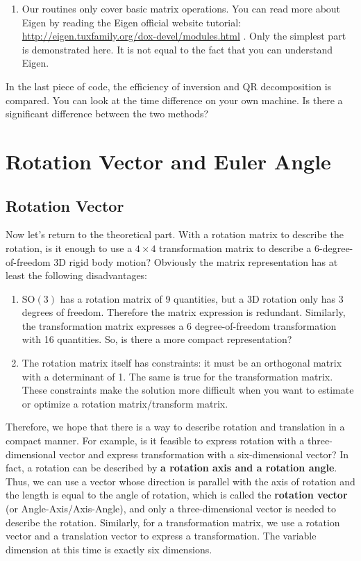 \begin{enumerate}
    \item Our routines only cover basic matrix operations. You can read more about Eigen by reading the Eigen official website tutorial: \\ { \url{http://eigen.tuxfamily.org/dox-devel/modules.html} }. Only the simplest part is demonstrated here. It is not equal to the fact that you can understand Eigen.
\end{enumerate}

In the last piece of code, the efficiency of inversion and QR decomposition is compared. You can look at the time difference on your own machine. Is there a significant difference between the two methods?

\section{Rotation Vector and Euler Angle}
\subsection{Rotation Vector}
Now let's return to the theoretical part. With a rotation matrix to describe the rotation, is it enough to use a $4 \times 4$ transformation matrix to describe a 6-degree-of-freedom 3D rigid body motion? Obviously the matrix representation has at least the following disadvantages:
\begin{enumerate}
    \item  $\mathrm{SO}( 3 ) $ has a rotation matrix of 9 quantities, but a 3D rotation only has 3 degrees of freedom. Therefore the matrix expression is redundant. Similarly, the transformation matrix expresses a 6 degree-of-freedom transformation with 16 quantities. So, is there a more compact representation?
    \item The rotation matrix itself has constraints: it must be an orthogonal matrix with a determinant of 1. The same is true for the transformation matrix. These constraints make the solution more difficult when you want to estimate or optimize a rotation matrix/transform matrix.
\end{enumerate}

Therefore, we hope that there is a way to describe rotation and translation in a compact manner. For example, is it feasible to express rotation with a three-dimensional vector and express transformation with a six-dimensional vector? In fact, a rotation can be described by \textbf {a rotation axis and a rotation angle}. Thus, we can use a vector whose direction is parallel with the axis of rotation and the length is equal to the angle of rotation, which is called the \textbf {rotation vector} (or Angle-Axis/Axis-Angle), and only a three-dimensional vector is needed to describe the rotation. Similarly, for a transformation matrix, we use a rotation vector and a translation vector to express a transformation. The variable dimension at this time is exactly six dimensions.

